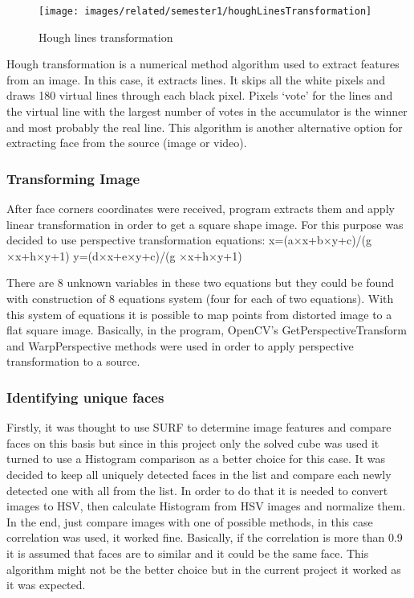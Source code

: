 \documentclass[../../main.tex]{subfiles}
\begin{document}
\begin{figure} [ht]
\begin{center}
\texttt{[image: images/related/semester1/houghLinesTransformation]}
\caption{Hough lines transformation}
\label{fig:houghLinesTransformation}
\end{center}
\end{figure} 

Hough transformation is a numerical method algorithm used to extract features from an image. In this case, it extracts lines. It skips all the white pixels and draws 180 virtual lines through each black pixel. Pixels ‘vote’ for the lines and the virtual line with the largest number of votes in the accumulator is the winner and most probably the real line.
This algorithm is another alternative option for extracting face from the source (image or video).

\subsubsection{Transforming Image}

After face corners coordinates were received, program extracts them and apply linear transformation in order to get a square shape image. For this purpose was decided to use perspective transformation equations:
x=(a×x+b×y+c)/(g ×x+h×y+1)
y=(d×x+e×y+c)/(g ×x+h×y+1)

There are 8 unknown variables in these two equations but they could be found with construction of 8 equations system (four for each of two equations). With this system of equations it is possible to map points from distorted image to a flat square image. Basically, in the program, OpenCV’s GetPerspectiveTransform and WarpPerspective methods were used in order to apply perspective transformation to a source.

\subsubsection{Identifying unique faces}

Firstly, it was thought to use SURF to determine image features and compare faces on this basis but since in this project only the solved cube was used it turned to use a Histogram comparison as a better choice for this case.
It was decided to keep all uniquely detected faces in the list and compare each newly detected one with all from the list. In order to do that it is needed to convert images to HSV, then calculate Histogram from HSV images and normalize them. In the end, just compare images with one of possible methods, in this case correlation was used, it worked fine. Basically, if the correlation is more than 0.9 it is assumed that faces are to similar and it could be the same face.
This algorithm might not be the better choice but in the current project it worked as it was expected.
\end{document}
